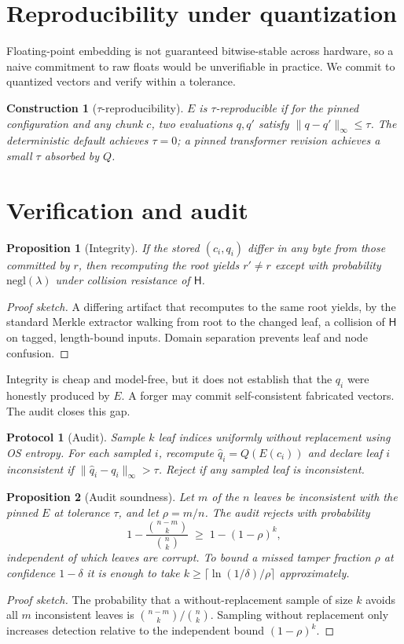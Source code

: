 \documentclass[10pt,twocolumn]{article}
\newtheorem{construction}{Construction}
\newtheorem{proposition}{Proposition}
\newtheorem{protocol}{Protocol}
\theoremstyle{remark}
\begin{document}
\section{Reproducibility under quantization}
\label{sec:repro}
Floating-point embedding is not guaranteed bitwise-stable across hardware, so a
naive commitment to raw floats would be unverifiable in practice. We commit to
quantized vectors and verify within a tolerance.
\begin{construction}[$\tau$-reproducibility]
\label{con:repro}
$E$ is $\tau$-reproducible if for the pinned configuration and any chunk $c$,
two evaluations $q,q'$ satisfy $\|q-q'\|_\infty\le\tau$. The deterministic
default achieves $\tau=0$; a pinned transformer revision achieves a small $\tau$
absorbed by $Q$.
\end{construction}

\section{Verification and audit}
\begin{proposition}[Integrity]
\label{prop:integrity}
If the stored $(c_i,q_i)$ differ in any byte from those committed by $r$, then
recomputing the root yields $r'\neq r$ except with probability
$\mathrm{negl}(\lambda)$ under collision resistance of $\mathsf{H}$.
\end{proposition}
\begin{proof}[Proof sketch]
A differing artifact that recomputes to the same root yields, by the standard
Merkle extractor walking from root to the changed leaf, a collision of
$\mathsf{H}$ on tagged, length-bound inputs. Domain separation prevents
leaf and node confusion. \end{proof}
Integrity is cheap and model-free, but it does not establish that the $q_i$ were
honestly produced by $E$. A forger may commit self-consistent fabricated
vectors. The audit closes this gap.

\begin{protocol}[Audit]
Sample $k$ leaf indices uniformly without replacement using OS entropy. For each
sampled $i$, recompute $\hat q_i = Q(E(c_i))$ and declare leaf $i$
\emph{inconsistent} if $\|\hat q_i - q_i\|_\infty>\tau$. Reject if any sampled
leaf is inconsistent.
\end{protocol}

\begin{proposition}[Audit soundness]
\label{prop:audit}
Let $m$ of the $n$ leaves be inconsistent with the pinned $E$ at tolerance
$\tau$, and let $\rho=m/n$. The audit rejects with probability
\[ 1-\frac{\binom{n-m}{k}}{\binom{n}{k}} \;\ge\; 1-(1-\rho)^k, \]
independent of which leaves are corrupt. To bound a missed tamper fraction
$\rho$ at confidence $1-\delta$ it is enough to take
$k\ge \lceil \ln(1/\delta)/\rho\rceil$ approximately.
\end{proposition}
\begin{proof}[Proof sketch]
The probability that a without-replacement sample of size $k$ avoids all $m$
inconsistent leaves is $\binom{n-m}{k}/\binom{n}{k}$. Sampling without
replacement only increases detection relative to the independent bound
$(1-\rho)^k$. \end{proof}
\end{document}
